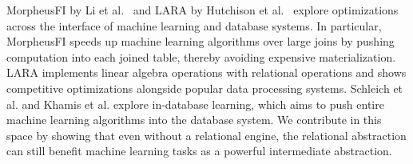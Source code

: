 MorpheusFI by Li et al.~\cite{DBLP:conf/sigmod/LiC019} and LARA by Hutchison et al.~\cite{DBLP:journals/corr/HutchisonHS17} explore optimizations across the interface of machine learning and database systems. In particular, MorpheusFI speeds up machine learning algorithms over large joins by pushing computation into each joined table, thereby avoiding expensive
materialization. LARA implements linear algebra operations with relational operations and
shows competitive optimizations alongside popular data processing systems. 
Schleich et al.\cite{DBLP:conf/sigmod/SchleichOC16} and Khamis et al.\cite{DBLP:journals/corr/NgoNOS17} explore in-database learning, which aims to push entire
machine learning algorithms into the database system. 
We contribute in this space by showing that even without a relational engine, the
relational abstraction can still benefit machine learning tasks as a powerful
intermediate abstraction. 


